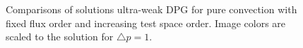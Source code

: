 \documentclass[final,leqno]{siamltex}
\begin{document}
\begin{figure}[!h]
\centering
{}
\caption{Comparisons of solutions ultra-weak DPG for pure convection with fixed flux order and increasing test space order.  Image colors are scaled to the solution for $\triangle p=1$.}
\label{fig:dpg_diffuse}
\end{figure}
\end{document}
